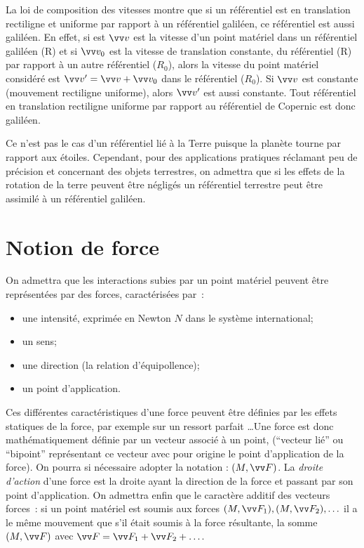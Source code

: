 La loi de composition des vitesses montre que si un référentiel est en translation rectiligne et uniforme par rapport à un référentiel galiléen, ce référentiel est aussi galiléen. En effet, si est $\vvv$ est la vitesse d'un point matériel dans un référentiel galiléen (R) et si $\vvv_0$ est la vitesse de translation constante, du référentiel (R) par rapport à un autre référentiel ($R_0$), alors la vitesse du point matériel considéré est $\vvv'=\vvv+\vvv_0$ dans le référentiel ($R_0$). Si $\vvv$ est constante (mouvement rectiligne uniforme), alors $\vvv'$ est aussi constante. Tout référentiel en translation rectiligne uniforme par rapport au référentiel de Copernic est donc galiléen.

Ce n'est pas le cas d'un référentiel lié à la Terre puisque la planète tourne par rapport aux étoiles. Cependant, pour des applications pratiques réclamant peu de précision et concernant des objets terrestres, on admettra que si les effets de la rotation de la terre peuvent être négligés un référentiel terrestre peut être assimilé à un référentiel galiléen. 

\section{Notion de force}
\label{chap2-sec:notiondeforce}

On admettra que les interactions subies par un point matériel peuvent être représentées par des forces, caractérisées par~:
\begin{itemize}
\item une intensité, exprimée en Newton $\si{N}$ dans le système international;
\item un sens;
\item une direction (la relation d'équipollence);
\item un point d'application.
\end{itemize}

Ces différentes caractéristiques d'une force peuvent être définies par les effets statiques de la force, par exemple sur un ressort parfait \ldots Une force est donc mathématiquement définie par un vecteur associé à un point, (``vecteur lié'' ou ``bipoint'' représentant ce vecteur avec pour origine le point d'application de la force). On pourra si nécessaire adopter la notation : $(M, \vF)$. La \emph{droite d'action} d'une force est la droite ayant la direction de la force et passant par son point d'application. On admettra enfin que le caractère additif des vecteurs forces~: si un point matériel est soumis aux forces $(M,\vF_1), (M,\vF_2), \ldots$ il a le même mouvement que s'il était soumis à la force résultante, la somme $(M, \vF)$ avec $\vF = \vF_1+\vF_2+\ldots$. 


